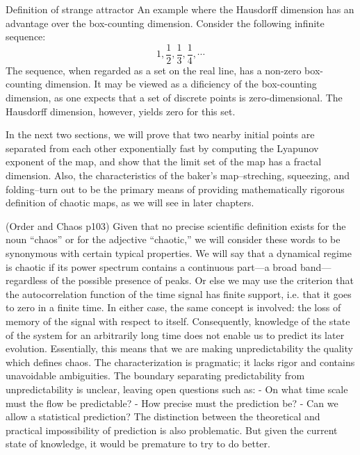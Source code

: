 \documentclass[12pt,twoside,draft]{book}
\begin{document}
Definition of strange attractor\citep[p.131]{ruelle}
An example where the Hausdorff dimension has an advantage over the box-counting dimension.
Consider the following infinite sequence:
\begin{equation*}
  1, \frac{1}{2}, \frac{1}{3}, \frac{1}{4}, \cdots
\end{equation*}
The sequence, when regarded as a set on the real line, has a non-zero box-counting dimension.
It may be viewed as a dificiency of the box-counting dimension, as one expects that
a set of discrete points is zero-dimensional.
The Hausdorff dimension, however, yields zero for this set.

In the next two sections, we will prove that two nearby initial points are separated from each other exponentially fast by computing the Lyapunov exponent of the map, and show that the limit set of the map has a fractal dimension.
Also, the characteristics of the baker's map--streching, squeezing, and folding--turn out to be the primary means of providing mathematically rigorous definition of chaotic maps, as we will see in later chapters.

(Order and Chaos p103)
Given that no precise scientific definition exists for the noun ``chaos'' or for the adjective ``chaotic,'' we will consider these words to be synonymous with certain typical properties.
We will say that a dynamical regime is chaotic if its power spectrum contains a continuous part---a broad band---regardless of the possible presence of peaks.
Or else we may use the criterion that the autocorrelation function of the time signal has finite support, i.e. that it goes to zero in a finite time.
In either case, the same concept is involved: the loss of memory of the signal with respect to itself.
Consequently, knowledge of the state of the system for an arbitrarily long time does not enable us to predict its later evolution.
Essentially, this means that we are making unpredictability the quality which defines chaos.
The characterization is pragmatic; it lacks rigor and contains unavoidable ambiguities.
The boundary separating predictability from unpredictability is unclear, leaving open questions such as:
- On what time scale must the flow be predictable?
- How precise must the prediction be?
- Can we allow a statistical prediction?
The distinction between the theoretical and practical impossibility of prediction is also problematic.
But given the current state of knowledge, it would be premature to try to do better.
\end{document}
